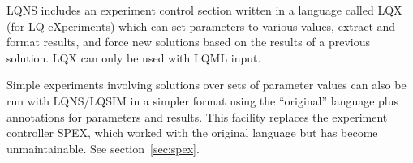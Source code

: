 \documentclass[11pt]{article}
\begin{document}
LQNS includes an experiment control section written in a language called LQX (for LQ
eXperiments) which can set parameters to various values, extract and format results, and force new
solutions based on the results of a previous solution. LQX can only be
used with LQML input.

Simple experiments involving solutions over sets of parameter values can also be run with
LQNS/LQSIM in a simpler format using the ``original'' language plus annotations for parameters
and results. This facility replaces the experiment controller SPEX, which worked with the original
language but has become unmaintainable. See section~\ref{sec:spex}.



\end{document}
